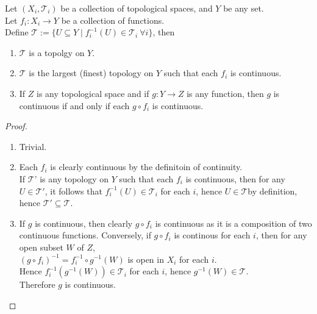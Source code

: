 
\begin{prop}
    Let $(X_i,\mathcal{T}_i)$ be a collection of topological spaces, and $Y$ be any set.\\
    Let $f_i:X_i\to Y$ be a collection of functions.\\
    Define $\mathcal{T}:=\{U\subseteq Y \mid f_i^{-1}(U)\in\mathcal{T}_i~\forall i\}$, then
    \begin{enumerate}
        \item $\mathcal{T}$ is a topolgy on $Y$.
        \item $\mathcal{T}$ is the largest (finest) topology on $Y$ such that each $f_i$ is continuous.
        \item If $Z$ is any topological space and if $g:Y\to Z$ is any function, then $g$ is continuous if and only if each $g\circ f_i$ is continuous.
    \end{enumerate}
\end{prop}
\begin{proof}
    ~\\
    \begin{enumerate}
        \item Trivial.
        \item Each $f_i$ is clearly continuous by the definitoin of continuity.\\
            If $\mathcal{T}$' is any topology on $Y$ such that each $f_i$ is continuous, then for any $U\in \mathcal{T}'$, it follows that $f_{i}^{-1}(U)\in\mathcal{T}_i$ for each $i$, hence $U\in\mathcal{T}$by definition, hence $\mathcal{T}'\subseteq\mathcal{T}$.
        \item If $g$ is continuous, then clearly $g\circ f_i$ is continuous as it is a composition of two continuous functions. Conversely, if $g\circ f_i$ is continous for each $i$, then for any open subset $W$ of $Z$,\\
            $(g\circ f_{i})^{-1}=f_i^{-1}\circ g^{-1}(W)$ is open in $X_i$ for each $i$.\\
            Hence $f_{i}^{-1}(g^{-1}(W))\in\mathcal{T}_i$ for each $i$, hence $g^{-1}(W)\in\mathcal{T}$.\\
            Therefore $g$ is continuous.
    \end{enumerate}
\end{proof}


